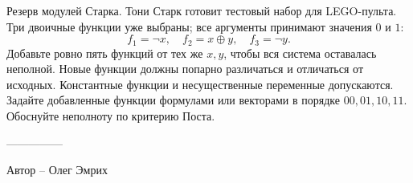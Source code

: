 \question
Резерв модулей Старка. Тони Старк готовит тестовый набор для LEGO-пульта. Три двоичные функции уже выбраны; все аргументы принимают значения $0$ и $1$:
\[
f_1=\neg x,\quad f_2=x\oplus y,\quad f_3=\neg y.
\]
Добавьте ровно пять функций от тех же $x,y$, чтобы вся система оставалась неполной. Новые функции должны попарно различаться и отличаться от исходных. Константные функции и несущественные переменные допускаются. Задайте добавленные функции формулами или векторами в порядке $00,01,10,11$. Обоснуйте неполноту по критерию Поста.

---------------

Автор -- Олег Эмрих
